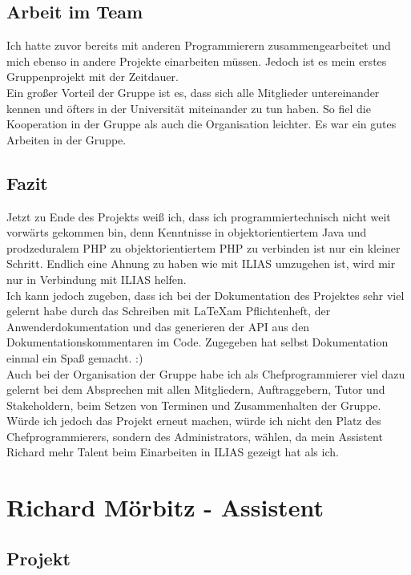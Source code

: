 \documentclass[a4paper]{scrreprt}
\begin{document}
\section{Arbeit im Team}
Ich hatte zuvor bereits mit anderen Programmierern zusammengearbeitet und mich ebenso in andere Projekte einarbeiten müssen. Jedoch ist es mein erstes Gruppenprojekt mit der Zeitdauer. \\
Ein großer Vorteil der Gruppe ist es, dass sich alle Mitglieder untereinander kennen und öfters in der Universität miteinander zu tun haben. So fiel die Kooperation in der Gruppe als auch die Organisation leichter. Es war ein gutes Arbeiten in der Gruppe.
\section{Fazit}
Jetzt zu Ende des Projekts weiß ich, dass ich programmiertechnisch nicht weit vorwärts gekommen bin, denn Kenntnisse in objektorientiertem Java und prodzeduralem PHP zu objektorientiertem PHP zu verbinden ist nur ein kleiner Schritt. Endlich eine Ahnung zu haben wie mit ILIAS umzugehen ist, wird mir nur in Verbindung mit ILIAS helfen.\\
Ich kann jedoch zugeben, dass ich bei der Dokumentation des Projektes sehr viel gelernt habe durch das Schreiben mit \LaTeX  am Pflichtenheft, der Anwenderdokumentation und das generieren der API aus den Dokumentationskommentaren im Code. Zugegeben hat selbst Dokumentation einmal ein Spaß gemacht. :)\\
Auch bei der Organisation der Gruppe habe ich als Chefprogrammierer viel dazu gelernt bei dem Absprechen mit allen Mitgliedern, Auftraggebern, Tutor und Stakeholdern, beim Setzen von Terminen und Zusammenhalten der Gruppe.
Würde ich jedoch das Projekt erneut machen, würde ich nicht den Platz des Chefprogrammierers, sondern des Administrators, wählen, da mein Assistent Richard mehr Talent beim Einarbeiten in ILIAS gezeigt hat als ich.

\chapter{Richard Mörbitz - Assistent}

\section{Projekt}
\end{document}
